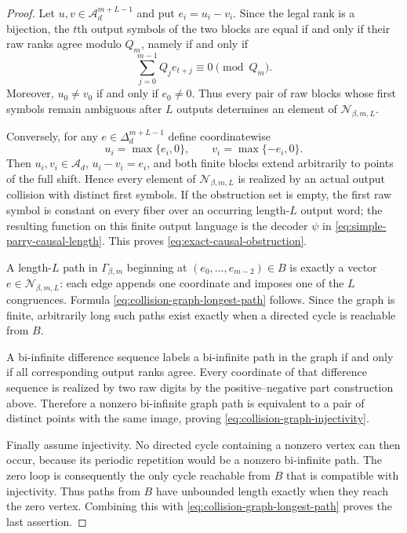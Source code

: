 \begin{proof}
Let $u,v\in\mathcal A_d^{m+L-1}$ and put $e_i=u_i-v_i$.  Since the legal
rank is a bijection, the $t$th output symbols of the two blocks are equal if
and only if their raw ranks agree modulo $Q_m$, namely if and only if
\[
\sum_{j=0}^{m-1}Q_je_{t+j}\equiv0\pmod{Q_m}.
\]
Moreover, $u_0\ne v_0$ if and only if $e_0\ne0$.  Thus every pair of raw
blocks whose first symbols remain ambiguous after $L$ outputs determines an
element of $\mathcal N_{\beta,m,L}$.

Conversely, for any $e\in\Delta_d^{m+L-1}$ define coordinatewise
\[
u_i=\max\{e_i,0\},\qquad v_i=\max\{-e_i,0\}.
\]
Then $u_i,v_i\in\mathcal A_d$, $u_i-v_i=e_i$, and both finite blocks extend
arbitrarily to points of the full shift.  Hence every element of
$\mathcal N_{\beta,m,L}$ is realized by an actual output collision with
distinct first symbols.  If the obstruction set is empty, the first raw
symbol is constant on every fiber over an occurring length-$L$ output word;
the resulting function on this finite output language is the decoder $\psi$
in \eqref{eq:simple-parry-causal-length}.  This proves
\eqref{eq:exact-causal-obstruction}.

A length-$L$ path in $\Gamma_{\beta,m}$ beginning at
$(e_0,\ldots,e_{m-2})\in B$ is exactly a vector
$e\in\mathcal N_{\beta,m,L}$: each edge appends one coordinate and imposes
one of the $L$ congruences.  Formula
\eqref{eq:collision-graph-longest-path} follows.  Since the graph is finite,
arbitrarily long such paths exist exactly when a directed cycle is reachable
from $B$.

A bi-infinite difference sequence labels a bi-infinite path in the graph if
and only if all corresponding output ranks agree.  Every coordinate of that
difference sequence is realized by two raw digits by the positive--negative
part construction above.  Therefore a nonzero bi-infinite graph path is
equivalent to a pair of distinct points with the same image, proving
\eqref{eq:collision-graph-injectivity}.

Finally assume injectivity.  No directed cycle containing a nonzero vertex
can then occur, because its periodic repetition would be a nonzero
bi-infinite path.  The zero loop is consequently the only cycle reachable
from $B$ that is compatible with injectivity.  Thus paths from $B$ have
unbounded length exactly when they reach the zero vertex.  Combining this
with \eqref{eq:collision-graph-longest-path} proves the last assertion.
\end{proof}

